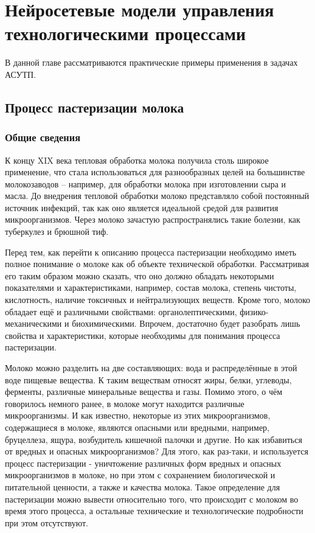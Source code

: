\chapter{Нейросетевые модели управления технологическими процессами}

В данной главе рассматриваются практические примеры применения в задачах АСУТП.

\section{Процесс пастеризации молока}

\subsection{Общие сведения}

К концу XIX века тепловая обработка молока получила столь широкое применение, что стала использоваться для разнообразных целей на большинстве молокозаводов – например, для обработки молока при изготовлении сыра и масла. До внедрения тепловой обработки молоко представляло собой постоянный источник инфекций, так как оно является идеальной средой для развития микроорганизмов. Через молоко зачастую распространялись такие болезни, как туберкулез и брюшной тиф.

Перед тем, как перейти к описанию процесса пастеризации необходимо иметь полное понимание о молоке как об объекте технической обработки. Рассматривая его таким образом можно сказать, что оно должно обладать некоторыми показателями и характеристиками, например, состав молока, степень чистоты, кислотность, наличие токсичных и нейтрализующих веществ. Кроме того, молоко обладает ещё и различными свойствами: органолептическими, физико-механическими и биохимическими. Впрочем, достаточно будет разобрать лишь свойства и характеристики, которые необходимы для понимания процесса пастеризации. 

Молоко можно разделить на две составляющих: вода и распределённые в этой воде пищевые вещества. К таким веществам относят жиры, белки, углеводы, ферменты, различные минеральные вещества и газы. Помимо этого, о чём говорилось немного ранее, в молоке могут находится различные микроорганизмы. И как известно, некоторые из этих микроорганизмов, содержащиеся в молоке, являются опасными или вредными, например, бруцеллеза, ящура, возбудитель кишечной палочки и другие. Но как избавиться от вредных и опасных микроорганизмов?  Для этого, как раз-таки, и используется процесс пастеризации - уничтожение различных форм вредных и опасных микроорганизмов в молоке, но при этом с сохранением биологической и питательной ценности, а также и качества молока. Такое определение для пастеризации можно вывести относительно того, что происходит с молоком во время этого процесса, а остальные технические и технологические подробности при этом отсутствуют. 

